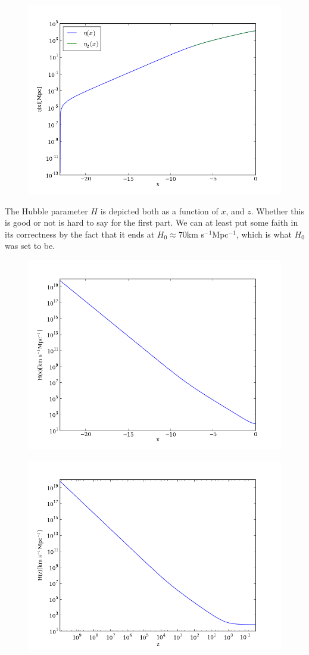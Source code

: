\documentclass{aa}   %
\begin{document}
  \begin{figure}
  \includegraphics[width=.49\textwidth]{figure_1.png}
  \caption{}
 \label{figure1}
 \end{figure}
 
 The Hubble parameter $H$ is depicted both as a function of $x$, and $z$. Whether this is good or not is hard to say for the first part. We can at least put some faith in its correctness by the fact that it ends at $H_0 \approx 70$km s$^{-1}$Mpc$^{-1}$, which is what $H_0$ was set to be. 
 
  \begin{figure}
  \includegraphics[width=.49\textwidth]{figure_2.png}
  \caption{}
 \label{figure2}
 \end{figure}

 
 \begin{figure}
  \includegraphics[width=.49\textwidth]{figure_3.png}
  \caption{}
 \label{figure3}
 \end{figure}
% 
\end{document}
